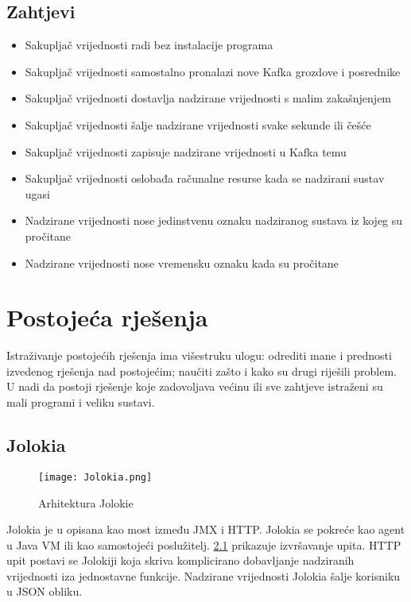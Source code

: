 \documentclass[times, utf8, diplomski, numeric]{fer}
\begin{document}
\section{Zahtjevi}

\begin{itemize}
    \item Sakupljač vrijednosti radi bez instalacije programa
    \item Sakupljač vrijednosti samostalno pronalazi nove Kafka grozdove i posrednike
    \item Sakupljač vrijednosti dostavlja nadzirane vrijednosti s malim zakašnjenjem
    \item Sakupljač vrijednosti šalje nadzirane vrijednosti svake sekunde ili češće
    \item Sakupljač vrijednosti zapisuje nadzirane vrijednosti u Kafka temu
    \item Sakupljač vrijednosti oslobađa računalne resurse kada se nadzirani sustav ugasi
    \item Nadzirane vrijednosti nose jedinstvenu oznaku nadziranog sustava iz kojeg su pročitane
    \item Nadzirane vrijednosti nose vremensku oznaku kada su pročitane
\end{itemize}

\chapter{Postojeća rješenja}

Istraživanje postojećih rješenja ima višestruku ulogu: odrediti mane i prednosti izvedenog rješenja nad postojećim; naučiti zašto i kako su drugi riješili problem. U nadi da postoji rješenje koje zadovoljava većinu ili sve zahtjeve istraženi su mali programi i veliku sustavi.

\section{Jolokia}

\begin{figure}[H]
    \centering
    \texttt{[image: Jolokia.png]}
    \caption{Arhitektura Jolokie}
    \label{fig:jolokia}
\end{figure}

Jolokia je u \citep{jolokia} opisana kao most između JMX i HTTP. Jolokia se pokreće kao agent u Java VM ili kao samostojeći poslužitelj. \ref{fig:jolokia} prikazuje izvršavanje upita. HTTP upit postavi se Jolokiji koja skriva komplicirano dobavljanje nadziranih vrijednosti iza jednostavne funkcije. Nadzirane vrijednosti Jolokia šalje korisniku u JSON obliku.
\end{document}
